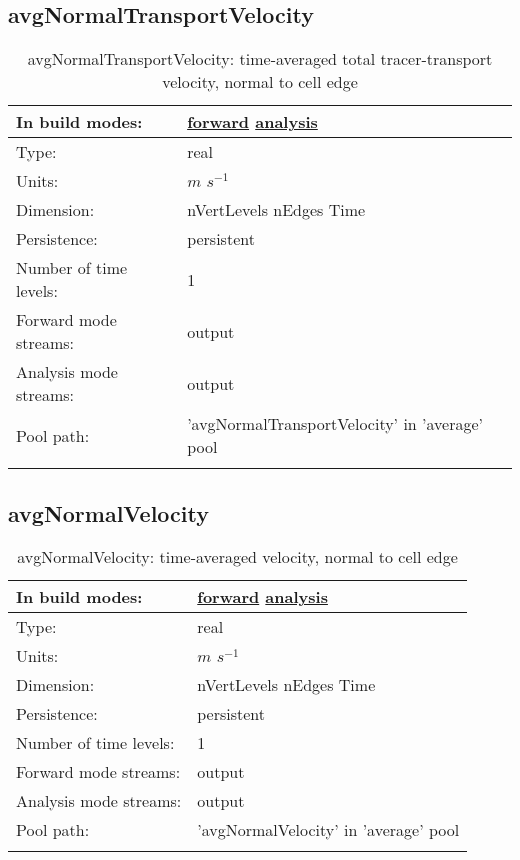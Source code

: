 \subsection[avgNormalTransportVelocity]{avgNormalTransportVelocity}
\label{subsec:var_sec_average_avgNormalTransportVelocity}
\begin{center}
\begin{longtable}{| p{2.0in} | p{4.0in} |}
        \hline 
        In build modes: & \hyperref[subsec:forward_var_tab_average]{forward} \hyperref[subsec:analysis_var_tab_average]{analysis} \\
        \hline 
        Type: & real \\
        \hline 
        Units: & $m$ $s^{-1}$ \\
        \hline 
        Dimension: & nVertLevels nEdges Time \\
        \hline 
        Persistence: & persistent \\
        \hline 
        Number of time levels: & 1 \\
        \hline 
		 Forward mode streams: &  output \\
        \hline 
		 Analysis mode streams: &  output \\
        \hline 
            Pool path: & 'avgNormalTransportVelocity' in 'average' pool
 \\
		 \hline 
    \caption{avgNormalTransportVelocity: time-averaged total tracer-transport velocity, normal to cell edge}
\end{longtable}
\end{center}
\subsection[avgNormalVelocity]{avgNormalVelocity}
\label{subsec:var_sec_average_avgNormalVelocity}
\begin{center}
\begin{longtable}{| p{2.0in} | p{4.0in} |}
        \hline 
        In build modes: & \hyperref[subsec:forward_var_tab_average]{forward} \hyperref[subsec:analysis_var_tab_average]{analysis} \\
        \hline 
        Type: & real \\
        \hline 
        Units: & $m$ $s^{-1}$ \\
        \hline 
        Dimension: & nVertLevels nEdges Time \\
        \hline 
        Persistence: & persistent \\
        \hline 
        Number of time levels: & 1 \\
        \hline 
		 Forward mode streams: &  output \\
        \hline 
		 Analysis mode streams: &  output \\
        \hline 
            Pool path: & 'avgNormalVelocity' in 'average' pool
 \\
		 \hline 
    \caption{avgNormalVelocity: time-averaged velocity, normal to cell edge}
\end{longtable}
\end{center}
